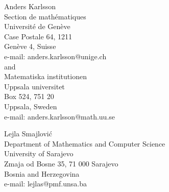 \documentclass[11pt,reqno]{amsart}
\theoremstyle{remark}
\begin{document}
\vspace{5mm}
\noindent
Anders Karlsson \\
 Section de mathématiques\\
 Université de Genève\\
 Case Postale 64, 1211\\
 Genève 4, Suisse\\
 e-mail: anders.karlsson@unige.ch \\
 and \\
 Matematiska institutionen \\
 Uppsala universitet \\
Box 524, 751 20 \\
 Uppsala, Sweden \\
 e-mail: anders.karlsson@math.uu.se

\vspace{5mm}
\noindent
Lejla Smajlovi\'{c} \\
 Department of Mathematics and Computer Science\\
 University of Sarajevo\\
 Zmaja od Bosne 35, 71 000 Sarajevo\\
 Bosnia and Herzegovina\\
 e-mail: lejlas@pmf.unsa.ba
\end{document}
